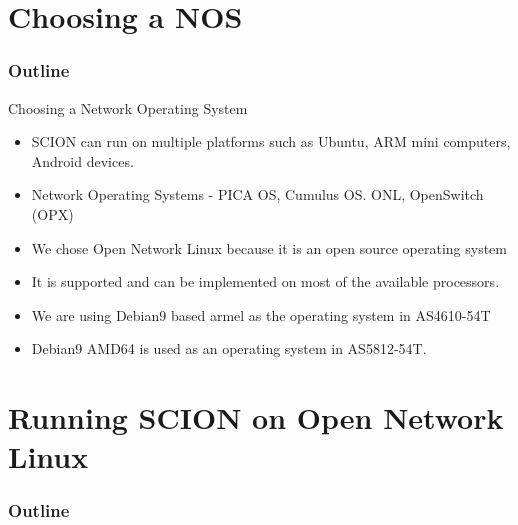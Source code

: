 \documentclass[12pt]{beamer}
\begin{document}

\section{Choosing a NOS}
\begin{frame}
\frametitle{Outline}
\tableofcontents[currentsection]
\end{frame}

\begin{frame}{Choosing a Network Operating System}
\begin{itemize}
    \item SCION can run on multiple platforms such as Ubuntu, ARM mini computers, Android devices.
    \item Network Operating Systems - PICA OS, Cumulus OS. ONL, OpenSwitch (OPX)
    \item We chose Open Network Linux because it is an open source operating system
    \item It is supported and can be implemented on most of the available processors.
    \item We are using Debian9 based armel as the operating system in AS4610-54T
    \item Debian9 AMD64 is used as an operating system in AS5812-54T.
    \end{itemize}
\end{frame}


\section{Running SCION on Open Network Linux}
\begin{frame}
\frametitle{Outline}
\tableofcontents[currentsection]
\end{frame}
\end{document}
